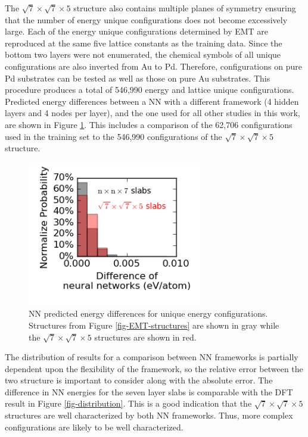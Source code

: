 \documentclass[12pt]{cmuthesis}
\begin{document}
The \(\sqrt{7} \times \sqrt{7} \times 5\) structure also contains multiple planes of symmetry ensuring that the number of energy unique configurations does not become excessively large. Each of the energy unique configurations determined by EMT are reproduced at the same five lattice constants as the training data. Since the bottom two layers were not enumerated, the chemical symbols of all unique configurations are also inverted from Au to Pd. Therefore, configurations on pure Pd substrates can be tested as well as those on pure Au substrates. This procedure produces a total of 546,990 energy and lattice unique configurations. Predicted energy differences between a NN with a different framework (4 hidden layers and 4 nodes per layer), and the one used for all other studies in this work, are shown in Figure \ref{fig-nn-diff}. This includes a comparison of the 62,706 configurations used in the training set to the 546,990 configurations of the \(\sqrt{7} \times \sqrt{7} \times 5\) structure.

\begin{figure}[h]
\centering
\includegraphics[width=3in]{./images/nn-diff.png}
\caption{\label{fig-nn-diff}
NN predicted energy differences for unique energy configurations. Structures from Figure \ref{fig-EMT-structures} are shown in gray while the \(\sqrt{7} \times \sqrt{7} \times 5\) structures are shown in red.}
\end{figure}

The distribution of results for a comparison between NN frameworks is partially dependent upon the flexibility of the framework, so the relative error between the two structure is important to consider along with the absolute error. The difference in NN energies for the seven layer slabs is comparable with the DFT result in Figure \ref{fig-distribution}. This is a good indication that the \(\sqrt{7} \times \sqrt{7} \times 5\) structures are well characterized by both NN frameworks. Thus, more complex configurations are likely to be well characterized.
\end{document}

